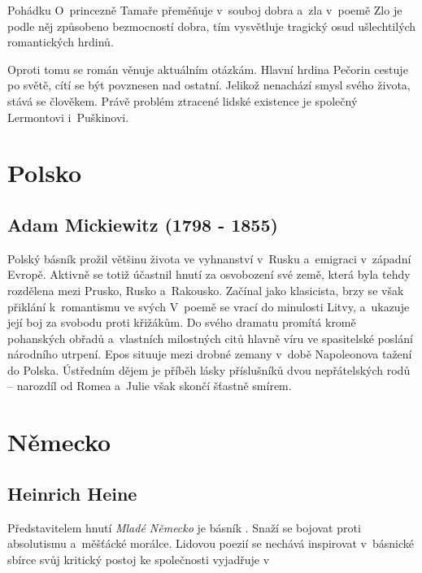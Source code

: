 Pohádku O~princezně Tamaře přeměňuje v~souboj dobra a~zla v~poemě
 Zlo je podle něj způsobeno bezmocností dobra, tím
vysvětluje tragický osud ušlechtilých romantických hrdinů.

Oproti tomu se román  věnuje aktuálním otázkám.
Hlavní hrdina Pečorin cestuje po světě, cítí se být povznesen nad
ostatní. Jelikož nenachází smysl svého života, stává se 
člověkem. Právě problém ztracené lidské existence je společný Lermontovi
i~Puškinovi.

\section{Polsko} \subsection*{Adam Mickiewitz (1798 - 1855)} Polský
básník  prožil většinu života ve vyhnanství
v~Rusku a~emigraci v~západní Evropě. Aktivně se totiž účastnil hnutí za
osvobození své země, která byla tehdy rozdělena mezi Prusko, Rusko
a~Rakousko. Začínal jako klasicista, brzy se však přiklání k~romantismu ve
svých  V~poemě  se
vrací do minulosti Litvy, a~ukazuje její boj za svobodu proti křižákům.
Do svého dramatu  promítá kromě pohanských obřadů
a~vlastních milostných citů hlavně víru ve spasitelské poslání národního
utrpení. Epos  situuje mezi drobné zemany v~době
Napoleonova tažení do Polska. Ústředním dějem je příběh lásky
příslušníků dvou nepřátelských rodů -- narozdíl od Romea a~Julie však
skončí šťastně smírem.

\section{Německo}

\subsection*{Heinrich Heine}
Představitelem hnutí \emph{Mladé Německo} je básník .
Snaží se bojovat proti absolutismu a~měšťácké morálce. Lidovou poezií se
nechává inspirovat v~básnické sbírce  svůj kritický
postoj ke společnosti vyjadřuje v~ 

